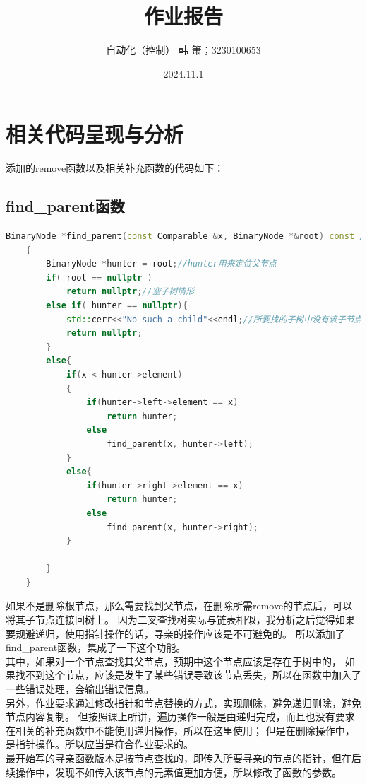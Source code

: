\documentclass[UTF8]{ctexart}
\title{作业报告}
\author{自动化（控制） 韩 箫；3230100653}
\date{2024.11.1}
\begin{document}
\maketitle

\pagestyle{fancy}
\fancyhead{}

\section{相关代码呈现与分析}
添加的remove函数以及相关补充函数的代码如下：
\subsection{find\_parent函数} 
\begin{lstlisting}[language=C++]
    BinaryNode *find_parent(const Comparable &x, BinaryNode *&root) const //寻亲函数，按值查找版
    {
        BinaryNode *hunter = root;//hunter用来定位父节点
        if( root == nullptr )
            return nullptr;//空子树情形
        else if( hunter == nullptr){
            std::cerr<<"No such a child"<<endl;//所要找的子树中没有该子节点，出错
            return nullptr;
        }
        else{
            if(x < hunter->element)
            {
                if(hunter->left->element == x)
                    return hunter;
                else 
                    find_parent(x, hunter->left);
            }
            else{
                if(hunter->right->element == x)
                    return hunter;
                else 
                    find_parent(x, hunter->right);                
            }

        }
    }
\end{lstlisting}
    如果不是删除根节点，那么需要找到父节点，在删除所需remove的节点后，可以将其子节点连接回树上。
    因为二叉查找树实际与链表相似，我分析之后觉得如果要规避递归，使用指针操作的话，寻亲的操作应该是不可避免的。
    所以添加了find\_parent函数，集成了一下这个功能。\\
    其中，如果对一个节点查找其父节点，预期中这个节点应该是存在于树中的，
    如果找不到这个节点，应该是发生了某些错误导致该节点丢失，所以在函数中加入了一些错误处理，会输出错误信息。\\
    另外，作业要求通过修改指针和节点替换的方式，实现删除，避免递归删除，避免节点内容复制。
    但按照课上所讲，遍历操作一般是由递归完成，而且也没有要求在相关的补充函数中不能使用递归操作，所以在这里使用；
    但是在删除操作中，是指针操作。所以应当是符合作业要求的。\\
    最开始写的寻亲函数版本是按节点查找的，即传入所要寻亲的节点的指针，但在后续操作中，发现不如传入该节点的元素值更加方便，所以修改了函数的参数。
\end{document}
